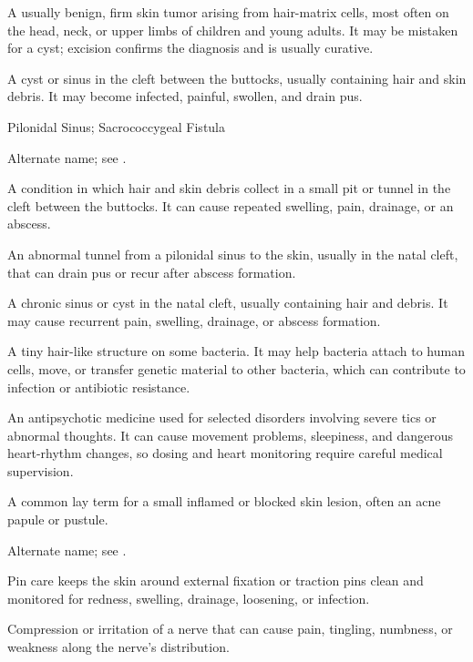  A usually benign, firm skin tumor arising from hair-matrix cells, most often on the head, neck, or upper limbs of children and young adults. It may be mistaken for a cyst; excision confirms the diagnosis and is usually curative.

 A cyst or sinus in the cleft between the buttocks, usually containing hair and skin debris. It may become infected, painful, swollen, and drain pus.

\synonyms
Pilonidal Sinus; Sacrococcygeal Fistula

 Alternate name; see .

 A condition in which hair and skin debris collect in a small pit or tunnel in the cleft between the buttocks. It can cause repeated swelling, pain, drainage, or an abscess.

 An abnormal tunnel from a pilonidal sinus to the skin, usually in the natal cleft, that can drain pus or recur after abscess formation.

 A chronic sinus or cyst in the natal cleft, usually containing hair and debris. It may
cause recurrent pain, swelling, drainage, or abscess formation.

 A tiny hair-like structure on some bacteria. It may help bacteria attach to human cells, move, or transfer genetic material to other bacteria, which can contribute to infection or antibiotic resistance.

 An antipsychotic medicine used for selected disorders involving severe tics or abnormal thoughts. It can cause movement problems, sleepiness, and dangerous heart-rhythm changes, so dosing and heart monitoring require careful medical supervision.

 A common lay term for a small inflamed or blocked skin lesion, often an acne papule or pustule.

 Alternate name; see .

 Pin care keeps the skin around external fixation or traction pins clean and monitored for redness, swelling, drainage, loosening, or infection.

 Compression or irritation of a nerve that can cause pain, tingling, numbness, or weakness along the nerve's distribution.

